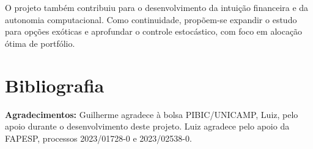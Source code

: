 \documentclass[12pt,openright,oneside,a4paper]{abntex2}
\numberwithin{equation}{section}
\begin{document}
O projeto também contribuiu para o desenvolvimento da intuição financeira e da autonomia computacional. Como continuidade, propõem-se expandir o estudo para opções exóticas e aprofundar o controle estocástico, com foco em alocação ótima de portfólio.

\section*{Bibliografia}
\printbibliography[heading=none]

\noindent\textbf{Agradecimentos:}  
 Guilherme agradece à bolsa PIBIC/UNICAMP, Luiz, pelo apoio durante o desenvolvimento deste projeto. Luiz agradece pelo apoio da FAPESP, processos  2023/01728-0 e 2023/02538-0.
\end{document}

